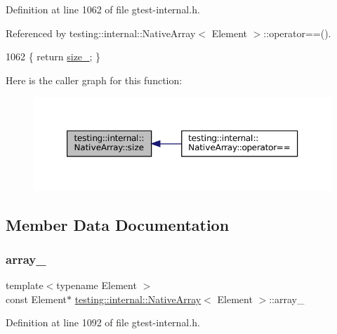 Definition at line 1062 of file gtest-\/internal.\+h.



Referenced by testing\+::internal\+::\+Native\+Array$<$ Element $>$\+::operator==().


\begin{DoxyCode}
1062 \{ \textcolor{keywordflow}{return} \hyperlink{classtesting_1_1internal_1_1NativeArray_aa7e4251de39aaa75f697f0eaeedbf06e}{size\_}; \}
\end{DoxyCode}
Here is the caller graph for this function\+:
\nopagebreak
\begin{figure}[H]
\begin{center}
\leavevmode
\includegraphics[width=350pt]{classtesting_1_1internal_1_1NativeArray_af96a4a5ca0cdd5d163c47a081f08bd89_icgraph}
\end{center}
\end{figure}


\subsection{Member Data Documentation}
\mbox{\label{classtesting_1_1internal_1_1NativeArray_adadc025fbbbd43904d4036991019f18f}} 
\subsubsection{\texorpdfstring{array\+\_\+}{array\_}}
{\footnotesize\ttfamily template$<$typename Element $>$ \\
const Element$\ast$ \hyperlink{classtesting_1_1internal_1_1NativeArray}{testing\+::internal\+::\+Native\+Array}$<$ Element $>$\+::array\+\_\+\hspace{0.3cm}{\ttfamily [private]}}



Definition at line 1092 of file gtest-\/internal.\+h.



